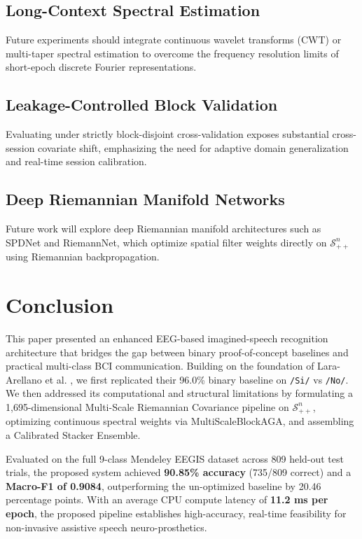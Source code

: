 \documentclass[10pt,twocolumn,a4paper]{article}
\begin{document}
\subsection{Long-Context Spectral Estimation}
Future experiments should integrate continuous wavelet transforms (CWT) or multi-taper spectral estimation to overcome the frequency resolution limits of short-epoch discrete Fourier representations.

\subsection{Leakage-Controlled Block Validation}
Evaluating under strictly block-disjoint cross-validation exposes substantial cross-session covariate shift, emphasizing the need for adaptive domain generalization and real-time session calibration.

\subsection{Deep Riemannian Manifold Networks}
Future work will explore deep Riemannian manifold architectures such as SPDNet and RiemannNet, which optimize spatial filter weights directly on $\mathcal{S}_{++}^n$ using Riemannian backpropagation.

\section{Conclusion}
This paper presented an enhanced EEG-based imagined-speech recognition architecture that bridges the gap between binary proof-of-concept baselines and practical multi-class BCI communication. Building on the foundation of Lara-Arellano et al. \cite{lara2025feature}, we first replicated their 96.0\% binary baseline on \texttt{/Si/} vs \texttt{/No/}. We then addressed its computational and structural limitations by formulating a 1,695-dimensional Multi-Scale Riemannian Covariance pipeline on $\mathcal{S}_{++}^n$, optimizing continuous spectral weights via MultiScaleBlockAGA, and assembling a Calibrated Stacker Ensemble.

Evaluated on the full 9-class Mendeley EEGIS dataset across 809 held-out test trials, the proposed system achieved \textbf{90.85\% accuracy} (735/809 correct) and a \textbf{Macro-F1 of 0.9084}, outperforming the un-optimized baseline by 20.46 percentage points. With an average CPU compute latency of \textbf{11.2 ms per epoch}, the proposed pipeline establishes high-accuracy, real-time feasibility for non-invasive assistive speech neuro-prosthetics.
\end{document}

